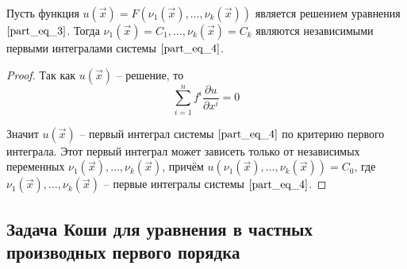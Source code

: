 \documentclass[a4paper, 12pt]{article}
\begin{document}
    \begin{theorem}
        Пусть функция $u(\overrightarrow{x}) = F(\nu_1(\overrightarrow{x}), \dots, \nu_k(\overrightarrow{x}))$ является решением уравнения $\eqref{part_eq_3}$. Тогда $\nu_1(\overrightarrow{x}) = C_1, \dots, \nu_k(\overrightarrow{x}) = C_k$ являются независимыми первыми интегралами системы $\eqref{part_eq_4}$. 
    \end{theorem}
    \begin{proof}
        Так как $u(\overrightarrow{x})$ -- решение, то 
        \begin{equation*}
            \sum \limits_{i = 1}^{n} f^i \frac{\partial u}{\partial x^i} = 0
        \end{equation*}

        Значит $u(\overrightarrow{x})$ -- первый интеграл системы $\eqref{part_eq_4}$ по критерию первого интеграла. Этот первый интеграл может зависеть только от независимых переменных $\nu_1(\overrightarrow{x}), \dots, \nu_k(\overrightarrow{x})$, причём $u(\nu_1(\overrightarrow{x}), \dots, \nu_k(\overrightarrow{x})) = C_0$, где $\nu_1(\overrightarrow{x}), \dots, \nu_k(\overrightarrow{x})$ -- первые интегралы системы $\eqref{part_eq_4}$.
    \end{proof}

    \subsection{Задача Коши для уравнения в частных производных первого порядка}
\end{document}
